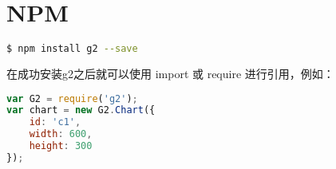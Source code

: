 \section{NPM}


\begin{lstlisting}[language=bash]
$ npm install g2 --save
\end{lstlisting}

在成功安装g2之后就可以使用 import 或 require 进行引用，例如：

\begin{lstlisting}[language=JavaScript]
var G2 = require('g2');
var chart = new G2.Chart({
    id: 'c1',
    width: 600,
    height: 300
});
\end{lstlisting}



\begin{lstlisting}[language=bash]

\end{lstlisting}




\begin{lstlisting}[language=bash]

\end{lstlisting}